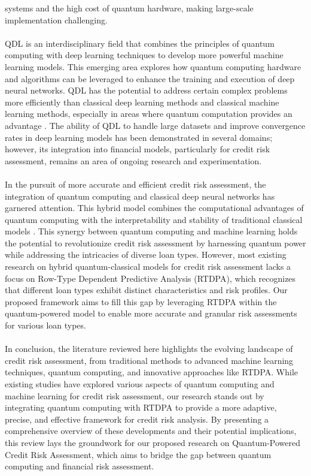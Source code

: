 systems and the high cost of quantum hardware, making large-scale implementation challenging.\\\\ QDL is an interdisciplinary field that combines the principles of quantum computing with deep learning techniques to develop more powerful machine learning models. This emerging area explores how quantum computing hardware and algorithms can be leveraged to enhance the training and execution of deep neural networks. QDL has the potential to address certain complex problems more efficiently than classical deep learning methods and classical machine learning methods, especially in areas where quantum computation provides an advantage \cite{9528698}. The ability of QDL to handle large datasets and improve convergence rates in deep learning models has been demonstrated in several domains; however, its integration into financial models, particularly for credit risk assessment, remains an area of ongoing research and experimentation.\\\\ In the pursuit of more accurate and efficient credit risk assessment, the integration of quantum computing and classical deep neural networks has garnered attention. This hybrid model combines the computational advantages of quantum computing with the interpretability and stability of traditional classical models \cite{biamonte2017quantum} \cite{havlicek2019supervised}. This synergy between quantum computing and machine learning holds the potential to revolutionize credit risk assessment by harnessing quantum power while addressing the intricacies of diverse loan types. However, most existing research on hybrid quantum-classical models for credit risk assessment lacks a focus on Row-Type Dependent Predictive Analysis (RTDPA), which recognizes that different loan types exhibit distinct characteristics and risk profiles. Our proposed framework aims to fill this gap by leveraging RTDPA within the quantum-powered model to enable more accurate and granular risk assessments for various loan types.\\\\ In conclusion, the literature reviewed here highlights the evolving landscape of credit risk assessment, from traditional methods to advanced machine learning techniques, quantum computing, and innovative approaches like RTDPA. While existing studies have explored various aspects of quantum computing and machine learning for credit risk assessment, our research stands out by integrating quantum computing with RTDPA to provide a more adaptive, precise, and effective framework for credit risk analysis. By presenting a comprehensive overview of these developments and their potential implications, this review lays the groundwork for our proposed research on Quantum-Powered Credit Risk Assessment, which aims to bridge the gap between quantum computing and financial risk assessment.